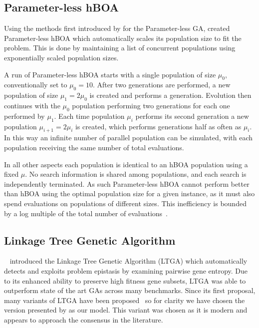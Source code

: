 \documentclass[twoside]{article}
\begin{document}
\subsection{Parameter-less hBOA}
Using the methods first introduced by \cite{harik:1999:parameterlessga} for the Parameter-less GA,
\cite{pelikan:2004:parameterlesshboa} created Parameter-less hBOA which automatically scales its
population size to fit the problem. This is done by maintaining a list of concurrent populations
using exponentially scaled population sizes.

A run of Parameter-less hBOA starts with a single population of size $\mu_0$, conventionally set
to $\mu_0=10$. After two generations are performed, a new population of size $\mu_1 = 2\mu_0$ is created
and performs a generation. Evolution then continues with the $\mu_0$ population performing two generations
for each one performed by $\mu_1$. Each time population $\mu_i$ performs its second generation a new population
$\mu_{i+1}=2\mu_i$ is created, which performs generations half as often as $\mu_i$. In this way an infinite number of
parallel population can be simulated, with each population receiving the same number of total evaluations.

In all other aspects each population is identical to an hBOA population using a fixed $\mu$. No search information
is shared among populations, and each search is independently terminated. As such Parameter-less hBOA cannot
perform better than hBOA using the optimal population size for a given instance, as it must also spend evaluations
on populations of different sizes. This inefficiency is bounded by a log multiple of the total number of
evaluations~\citep{pelikan:1999:worstparameter-less}.

\subsection{Linkage Tree Genetic Algorithm}
~\cite{thierens:2010:ltga} introduced the Linkage Tree Genetic Algorithm (LTGA) which automatically
detects and exploits problem epistasis by examining pairwise gene entropy. Due to its enhanced
ability to preserve high fitness gene subsets, LTGA was able to outperform state of the art
GAs across many benchmarks. Since its first proposal, many variants of LTGA have been
proposed~\citep{goldman:2012:ltga} so for clarity we have chosen the version
presented by \cite{thierens:2013:ltgahiff} as our model. This variant was chosen as it is
modern and appears to approach the consensus in the literature.
\end{document}
